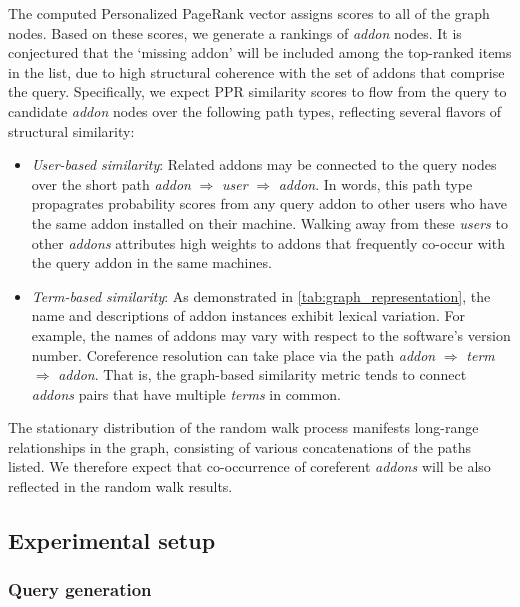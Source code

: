 \documentclass[ijoc,nonblindrev]{informs3} %
\numberwithin{equation}{subsection}
\begin{document}
The computed Personalized PageRank vector assigns scores to all of the graph nodes. Based on these scores, we generate a rankings of {\it addon} nodes. It is conjectured that the `missing addon' will be included among the top-ranked items in the list, due to high structural coherence with the set of addons that comprise the query. Specifically, we expect PPR similarity scores to flow from the query to candidate {\it addon} nodes over the following path types, reflecting several flavors of structural similarity:
\begin{itemize}
\item {\it User-based similarity}: Related addons may be connected to the query nodes over the short path  {\it addon} $\Rightarrow$ {\it user}
   $\Rightarrow$ {\it addon}. In words, this path type propagrates probability scores from any query addon to other users who have the same addon installed on their machine. Walking away from these {\it users} to other {\it addons} attributes high weights to addons that frequently co-occur with the query addon in the same machines. 
\item {\it Term-based similarity}: As demonstrated in \autoref{tab:graph_representation}, the name and descriptions of addon instances exhibit lexical variation. For example, the names of addons may vary with respect to the software's version number. Coreference resolution can take place via the path {\it addon} $\Rightarrow$ {\it term} $\Rightarrow$ {\it addon}. That is, the graph-based similarity metric tends to connect {\it addons} pairs that have multiple {\it terms} in common. 
\end{itemize}
The stationary distribution of the random walk process manifests long-range relationships in the graph, consisting of various concatenations of the paths listed. We therefore expect that co-occurrence of coreferent {\it addons} will be also reflected in the random walk results.

\subsection{Experimental setup}

\subsubsection{Query generation}
\end{document}
